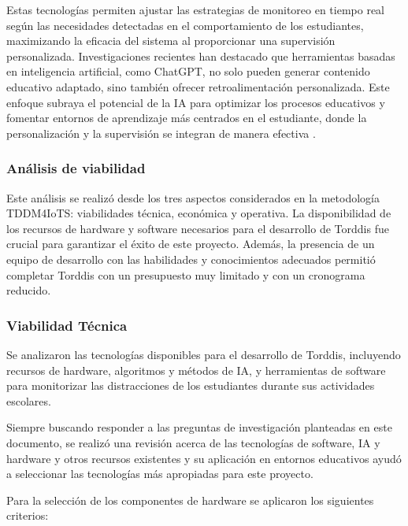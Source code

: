 \documentclass[a4paper,fleqn]{cas-sc}
\begin{document}
					Estas tecnologías permiten ajustar las estrategias de monitoreo en tiempo real según las necesidades detectadas en el comportamiento de los estudiantes, maximizando la eficacia del sistema al proporcionar una supervisión personalizada. Investigaciones recientes han destacado que herramientas basadas en inteligencia artificial, como ChatGPT, no solo pueden generar contenido educativo adaptado, sino también ofrecer retroalimentación personalizada. Este enfoque subraya el potencial de la IA para optimizar los procesos educativos y fomentar entornos de aprendizaje más centrados en el estudiante, donde la personalización y la supervisión se integran de manera efectiva \citep{Wang2025Development, Li2024Systematic}.
				
				\subsubsection*{Análisis de viabilidad}
					Este análisis se realizó desde los tres aspectos considerados en la metodología TDDM4IoTS: viabilidades técnica, económica y operativa. La disponibilidad de los recursos de hardware y software necesarios para el desarrollo de Torddis fue crucial para garantizar el éxito de este proyecto. Además, la presencia de un equipo de desarrollo con las habilidades y conocimientos adecuados permitió completar Torddis con un presupuesto muy limitado y con un cronograma reducido.
				
				\subsubsection*{Viabilidad Técnica}
					Se analizaron las tecnologías disponibles para el desarrollo de Torddis, incluyendo recursos de hardware, algoritmos y métodos de IA, y herramientas de software para monitorizar las distracciones de los estudiantes durante sus actividades escolares.
				
					Siempre buscando responder a las preguntas de investigación planteadas en este documento, se realizó una revisión acerca de las tecnologías de software, IA y hardware y otros recursos existentes y su aplicación en entornos educativos ayudó a seleccionar las tecnologías más apropiadas para este proyecto.
					
					Para la selección de los componentes de hardware se aplicaron los siguientes criterios:
					
\end{document}
